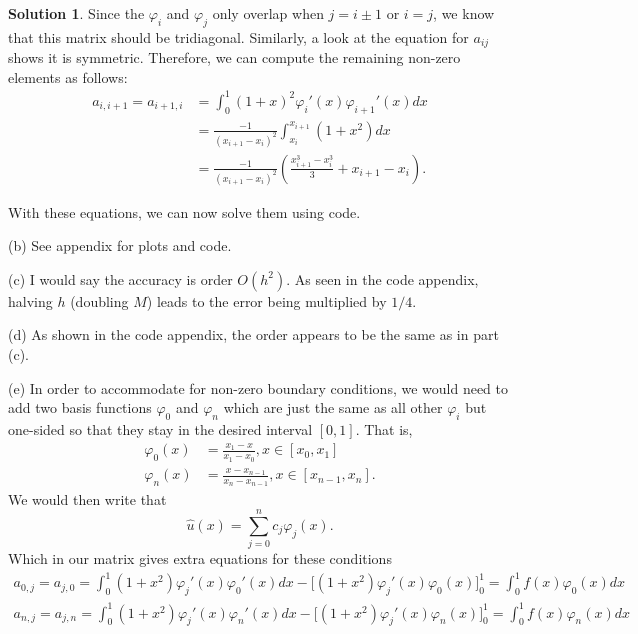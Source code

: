 \documentclass[12pt]{article}
\renewcommand{\phi}{\varphi}
\theoremstyle{definition}
\newtheorem{sol}{Solution}
\theoremstyle{remark}
\begin{document}
\begin{sol}
Since the $\phi_{i}$ and $\phi_{j}$ only overlap when $j = i \pm 1$ or $i = j$, we know that this matrix should be tridiagonal. Similarly, a look at the equation for $a_{ij}$ shows it is symmetric. Therefore, we can compute the remaining non-zero elements as follows:
\begin{align*}
    a_{i,i+1} = a_{i+1,i} &= \int_{0}^{1}  (1 + x)^{2} \phi_{i}'(x) \phi_{i+1}'(x) dx\\
                          &= \frac{-1}{(x_{i+1} - x_{i})^{2}} \int_{x_{i}}^{x_{i+1}} (1 + x^{2})dx\\
                          &=  \frac{-1}{(x_{i+1} - x_{i})^{2}} \left( \frac{x_{i+1}^{3} - x_{i}^{3}}{3} + x_{i+1} - x_{i} \right).
\end{align*}

With these equations, we can now solve them using code.

(b) See appendix for plots and code.


(c) I would say the accuracy is order $O(h^{2})$. As seen in the code appendix, halving $h$ (doubling $M$) leads to the error being multiplied by $1 / 4$. 

(d) As shown in the code appendix, the order appears to be the same as in part (c).

(e) In order to accommodate for non-zero boundary conditions, we would need to add two basis functions $\phi_{0}$ and $\phi_{n}$ which are just the same as all other $\phi_{i}$ but one-sided so that they stay in the desired interval $[0,1]$. That is,
\begin{align*}
    \phi_{0}(x) &= \frac{x_{1} - x}{x_{1} - x_{0}}, x\in[x_{0}, x_{1}]\\
    \phi_{n}(x) &= \frac{x-x_{n-1}}{x_{n}-x_{n-1}}, x\in [x_{n-1}, x_{n}].
\end{align*}
We would then write that 
\begin{equation*}
    \hat{u}(x) = \sum_{j=0}^{n} c_{j} \phi_{j}(x).
\end{equation*}
Which in our matrix gives extra equations for these conditions
\begin{align*}
   a_{0,j} = a_{j,0} = \int_{0}^{1} (1 + x^{2}) \phi_{j}'(x) \phi_{0}'(x)dx -  \Big[ (1 + x^{2}) \phi_{j}'(x) \phi_{0}(x) \Big]_{0}^{1} = \int_{0}^{1} f(x) \phi_{0}(x)dx\\
   a_{n,j} = a_{j,n} =  \int_{0}^{1} (1 + x^{2}) \phi_{j}'(x) \phi_{n}'(x)dx  - \Big[ (1 + x^{2}) \phi_{j}'(x) \phi_{n}(x) \Big]_{0}^{1} = \int_{0}^{1} f(x) \phi_{n}(x)dx
\end{align*}
\end{sol}
\end{document}
